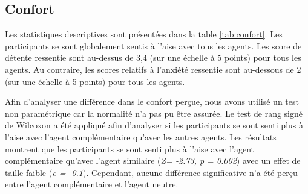 	\subsection{Confort}
		
		Les statistiques descriptives sont présentées dans la table \ref{tab:confort}. Les participants se sont globalement sentis à l'aise avec tous les agents.
		Les score de détente ressentie sont au-dessus de 3,4 (sur une échelle à 5 points) pour tous les agents. Au contraire, les scores relatifs à l'anxiété  ressentie sont au-dessous de 2 (sur une échelle à 5 points) pour tous les agents. 
		
		Afin d'analyser une différence dans le confort perçue, nous avons utilisé un test non paramétrique car la normalité n'a pas pu être assurée. Le test de rang signé de Wilcoxon a été appliqué afin d'analyser si les participants se sont senti plus à l'aise avec l'agent complémentaire qu'avec les autres agents. 
		Les résultats montrent que les participants se sont senti plus à l'aise avec l'agent complémentaire qu'avec l'agent similaire (\emph{Z= -2.73, p = 0.002})
		avec un effet de taille faible (\emph{e = -0.1}). Cependant, aucune différence significative n'a été perçu entre l'agent complémentaire et l'agent neutre. 
	
